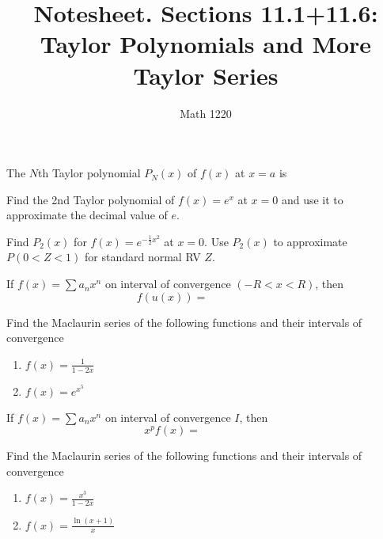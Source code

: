 \documentclass[12pt, a4paper]{article}
\author{Math 1220}
\title{Notesheet. Sections 11.1+11.6: Taylor Polynomials and More
  Taylor Series}
\date{}
\begin{document}
\maketitle
\nameline
\begin{defi}
  The \(N\)th Taylor polynomial \(P_N(x)\) of \(f(x)\) at \(x=a\) is 
\end{defi}
\begin{ex}
  Find the 2nd Taylor polynomial of \(f(x) = e^x\) at \(x=0\) and use it to
  approximate the decimal value of \(e\).
\end{ex}
\begin{ex}
  Find \(P_2(x)\) for \(f(x) = e^{-\frac{1}{2}x^2}\) at \(x=0\). Use
  \(P_2(x)\) to approximate \(P(0 < Z < 1)\) for standard normal RV \(Z\).
\end{ex}
\pagebreak
\begin{thrm}
  If \(f(x) = \sum a_n x^n\) on interval of convergence \((-R < x <
  R)\), then \[
    f(u(x)) = \hspace{1in}
  \]
\end{thrm}
\vspace{-0.75in}
\begin{ex}
  Find the Maclaurin series of the following functions and their
  intervals of convergence
  \begin{enumerate}
  \item \(f(x) = \frac{1}{1-2x}\)
    \vspace{1.5in}
  \item \(f(x) = e^{x^5}\)
  \end{enumerate}
\end{ex}
\vspace{-0.5in}
\begin{thrm}
  If \(f(x) = \sum a_n x^n\) on interval of convergence \(I\), then \[
    x^p f(x) = \hspace{1in}
  \]
\end{thrm}
\vspace{-0.5in}
\begin{ex}
  Find the Maclaurin series of the following functions and their
  intervals of convergence
  \begin{enumerate}
  \item \(f(x) = \frac{x^3}{1-2x}\)
    \vspace{1in}
  \item \(f(x) = \frac{\ln(x+1)}{x}\)
  \end{enumerate}

\end{ex}
\end{document}
